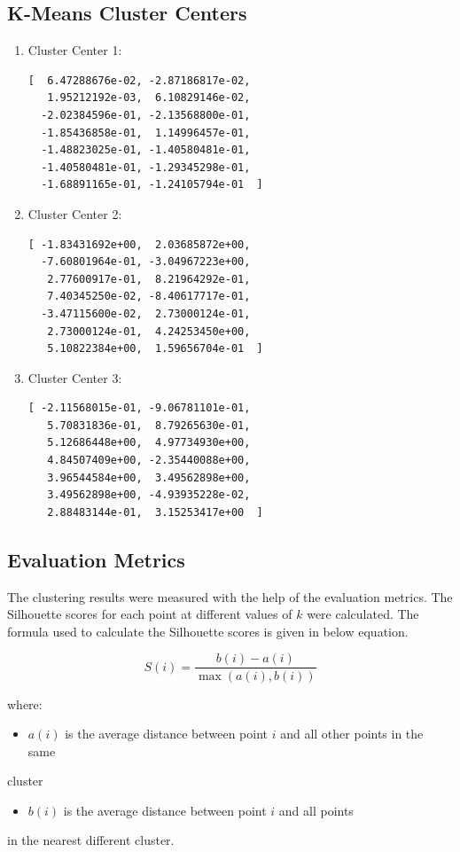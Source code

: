 \documentclass[conference]{IEEEtran}
\begin{document}
\subsection{K-Means Cluster Centers}
\label{sec:orga1dad42}
\begin{enumerate}
\item Cluster Center 1:
\begin{verbatim}
[  6.47288676e-02, -2.87186817e-02,
   1.95212192e-03,  6.10829146e-02,
  -2.02384596e-01, -2.13568800e-01,
  -1.85436858e-01,  1.14996457e-01,
  -1.48823025e-01, -1.40580481e-01,
  -1.40580481e-01, -1.29345298e-01,
  -1.68891165e-01, -1.24105794e-01  ]
\end{verbatim}

\item Cluster Center 2:
\begin{verbatim}
[ -1.83431692e+00,  2.03685872e+00,
  -7.60801964e-01, -3.04967223e+00,
   2.77600917e-01,  8.21964292e-01,
   7.40345250e-02, -8.40617717e-01,
  -3.47115600e-02,  2.73000124e-01,
   2.73000124e-01,  4.24253450e+00,
   5.10822384e+00,  1.59656704e-01  ]
\end{verbatim}

\item Cluster Center 3:
\begin{verbatim}
[ -2.11568015e-01, -9.06781101e-01,
   5.70831836e-01,  8.79265630e-01,
   5.12686448e+00,  4.97734930e+00,
   4.84507409e+00, -2.35440088e+00,
   3.96544584e+00,  3.49562898e+00,
   3.49562898e+00, -4.93935228e-02,
   2.88483144e-01,  3.15253417e+00  ]
\end{verbatim}
\end{enumerate}
\subsection{Evaluation Metrics}
\label{sec:orgbd00cab}
The clustering results were measured with the help of the evaluation metrics.
The Silhouette scores for each point at different values of \(k\) were
calculated. The formula used to calculate the Silhouette scores is given in
below equation.

\begin{equation}
S(i) = \frac{b(i) - a(i)}{\max(a(i), b(i))}
\end{equation}

where:
\begin{itemize}
\item \(a(i)\) is the average distance between point \(i\) and all other points in the same
\end{itemize}
cluster
\begin{itemize}
\item \(b(i)\) is the average distance between point \(i\) and all points
\end{itemize}
in the nearest different cluster.
\end{document}
